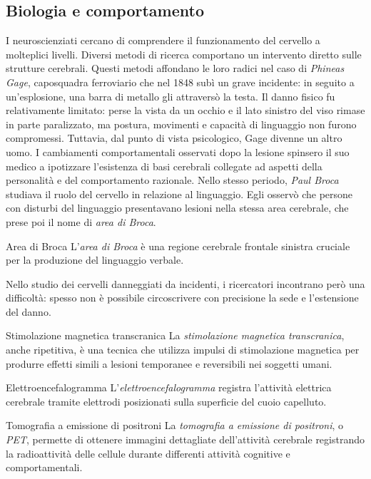 \documentclass[a4paper]{article}
\begin{document}
\subsection{Biologia e comportamento}
I neuroscienziati cercano di comprendere il funzionamento del cervello a molteplici livelli. Diversi metodi di ricerca comportano un intervento diretto sulle strutture cerebrali.
Questi metodi affondano le loro radici nel caso di \emph{Phineas Gage}, caposquadra ferroviario che nel 1848 subì un grave incidente: in seguito a un'esplosione, una barra di metallo gli attraversò la testa.
Il danno fisico fu relativamente limitato: perse la vista da un occhio e il lato sinistro del viso rimase in parte paralizzato, ma postura, movimenti e capacità di linguaggio non furono compromessi. Tuttavia, dal punto di vista psicologico, Gage divenne un altro uomo.
I cambiamenti comportamentali osservati dopo la lesione spinsero il suo medico a ipotizzare l'esistenza di basi cerebrali collegate ad aspetti della personalità e del comportamento razionale.
Nello stesso periodo, \emph{Paul Broca} studiava il ruolo del cervello in relazione al linguaggio. Egli osservò che persone con disturbi del linguaggio presentavano lesioni nella stessa area cerebrale, che prese poi il nome di \emph{area di Broca}.
\begin{snippetdefinition}{Area di Broca}
    L'\emph{area di Broca} è una regione cerebrale frontale sinistra cruciale per la produzione del linguaggio verbale.
\end{snippetdefinition}
Nello studio dei cervelli danneggiati da incidenti, i ricercatori incontrano però una difficoltà: spesso non è possibile circoscrivere con precisione la sede e l'estensione del danno.
\begin{snippetdefinition}{Stimolazione magnetica transcranica}
    La \emph{stimolazione magnetica transcranica}, anche ripetitiva, è una tecnica che utilizza impulsi di stimolazione magnetica per produrre effetti simili a lesioni temporanee e reversibili nei soggetti umani.
\end{snippetdefinition}
\begin{snippetdefinition}{Elettroencefalogramma}
    L'\emph{elettroencefalogramma} registra l'attività elettrica cerebrale tramite elettrodi posizionati sulla superficie del cuoio capelluto.
\end{snippetdefinition}
\begin{snippetdefinition}{Tomografia a emissione di positroni}
    La \emph{tomografia a emissione di positroni}, o \emph{PET}, permette di ottenere immagini dettagliate dell'attività cerebrale registrando la radioattività delle cellule durante differenti attività cognitive e comportamentali.
\end{snippetdefinition}
\end{document}
